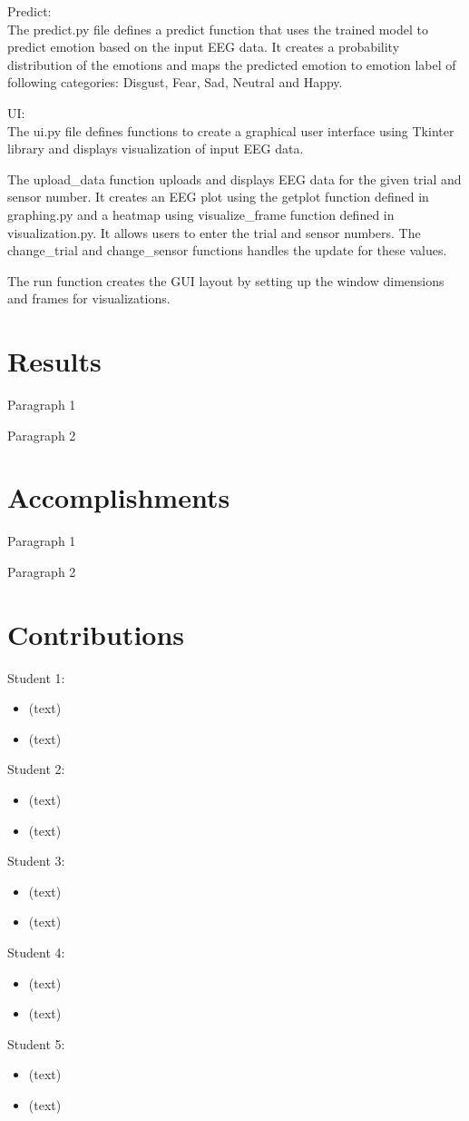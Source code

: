 \documentclass[12pt, a4paper]{report}
\begin{document}
Predict: 
\\ The predict.py file defines a predict function that uses the trained model to predict emotion based on the input EEG data. It creates a probability distribution of the emotions and maps the predicted emotion to emotion label of following categories: Disgust, Fear, Sad, Neutral and Happy.

UI: 
\\ The ui.py file defines functions to create a graphical user interface using Tkinter library and displays visualization of input EEG data.

The upload\_data function uploads and displays EEG data for the given trial and sensor number. It creates an EEG plot using the getplot function defined in graphing.py and a heatmap using visualize\_frame function defined in visualization.py. It allows users to enter the trial and sensor numbers. The change\_trial and change\_sensor functions handles the update for these values.

The run function creates the GUI layout by setting up the window dimensions and frames for visualizations.

\section{Results}
Paragraph 1

Paragraph 2

\section{Accomplishments}
Paragraph 1

Paragraph 2

\section{Contributions}
Student 1:
\begin{itemize}
  \item (text)
  \item (text)
\end{itemize}
Student 2:
\begin{itemize}
  \item (text)
  \item (text)
\end{itemize}
Student 3:
\begin{itemize}
  \item (text)
  \item (text)
\end{itemize}
Student 4:
\begin{itemize}
  \item (text)
  \item (text)
\end{itemize}
Student 5:
\begin{itemize}
  \item (text)
  \item (text)
\end{itemize}
\end{document}
